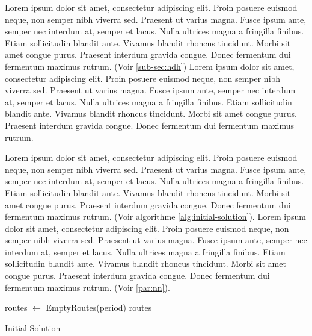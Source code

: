 \medskip
Lorem ipsum dolor sit amet, consectetur adipiscing elit. Proin posuere euismod neque, non semper nibh viverra sed. Praesent ut varius magna. Fusce ipsum ante, semper nec interdum at, semper et lacus. Nulla ultrices magna a fringilla finibus. Etiam sollicitudin blandit ante. Vivamus blandit rhoncus tincidunt. Morbi sit amet congue purus. Praesent interdum gravida congue. Donec fermentum dui fermentum maximus rutrum. \parencite{hemmelmayr_variable_2009} (Voir \ref{sub-sec:hdh}) Lorem ipsum dolor sit amet, consectetur adipiscing elit. Proin posuere euismod neque, non semper nibh viverra sed. Praesent ut varius magna. Fusce ipsum ante, semper nec interdum at, semper et lacus. Nulla ultrices magna a fringilla finibus. Etiam sollicitudin blandit ante. Vivamus blandit rhoncus tincidunt. Morbi sit amet congue purus. Praesent interdum gravida congue. Donec fermentum dui fermentum maximus rutrum.

Lorem ipsum dolor sit amet, consectetur adipiscing elit. Proin posuere euismod neque, non semper nibh viverra sed. Praesent ut varius magna. Fusce ipsum ante, semper nec interdum at, semper et lacus. Nulla ultrices magna a fringilla finibus. Etiam sollicitudin blandit ante. Vivamus blandit rhoncus tincidunt. Morbi sit amet congue purus. Praesent interdum gravida congue. Donec fermentum dui fermentum maximus rutrum. (Voir algorithme \ref{alg:initial-solution}). Lorem ipsum dolor sit amet, consectetur adipiscing elit. Proin posuere euismod neque, non semper nibh viverra sed. Praesent ut varius magna. Fusce ipsum ante, semper nec interdum at, semper et lacus. Nulla ultrices magna a fringilla finibus. Etiam sollicitudin blandit ante. Vivamus blandit rhoncus tincidunt. Morbi sit amet congue purus. Praesent interdum gravida congue. Donec fermentum dui fermentum maximus rutrum. (Voir \ref{par:nn}).

\medskip

\begin{algorithm}[H]
  routes $\gets$ EmptyRoutes(period) \;
  \Return routes \;
  \caption{Initial Solution}
  \label{alg:initial-solution}
\end{algorithm}
\FloatBarrier

